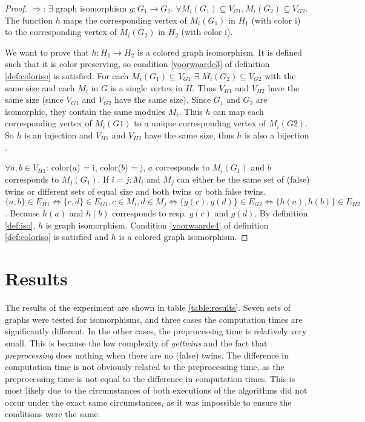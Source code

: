 \documentclass[twoside]{article}
\theoremstyle{definition}
\theoremstyle{plain}
\begin{document}
\begin{multicols}{2}
\begin{proof}
$\Rightarrow$: $\exists$ graph isomorphism $g: G_1 \to G_2$. $\forall M_i (G_1) \subseteq V_{G1}, M_i (G_2) \subseteq V_{G2}$. The function $h$ maps the corresponding vertex of $M_i (G_1)$ in $H_1$ (with color i) to the corresponding vertex of $M_i (G_2)$ in $H_2$ (with color i).

We want to prove that $h: H_1 \to H_2$ is a colored graph isomorphism. It is defined such that it is color preserving, so condition \ref{voorwaarde3} of definition \ref{def:coloriso} is satisfied. For each $M_i (G_1) \subseteq V_{G1}$ $\exists$ $M_i (G_2) \subseteq V_{G2}$ with the same size and each $M_i$ in $G$ is a single vertex in $H$. Thus $V_{H1}$ and $V_{H2}$ have the same size (since $V_{G1}$ and $V_{G2}$ have the same size). Since $G_1$ and $G_2$ are isomorphic, they contain the same modules $M_i$. Thus $h$ can map each corresponding vertex of $M_i (G1)$ to a unique corresponding vertex of $M_i (G2)$. So $h$ is an injection and $V_{H1}$ and $V_{H2}$ have the same size, thus $h$ is also a bijection \cite{website:proofwiki}.

$\forall a, b \in V_{H1}$: color($a$) = i, color($b$) = j, $a$ corresponds to $M_i (G_1)$ and $b$ corresponds to $M_j (G_1)$. If $i=j: M_i$ and $M_j$ can either be the same set of (false) twins or different sets of equal size and both twins or both false twins.  $ \{a, b\} \in E_{H1} \iff \{c,d\} \in E_{G1}, c \in  M_i, d \in  M_j \iff \{g(c),g(d)\} \in E_{G2} \iff \{h(a),h(b)\} \in E_{H2}$. Because $h(a)$ and $h(b)$ corresponds to resp. $g(c)$ and $g(d)$. By definition \ref{def:iso}, $h$ is graph isomorphism. Condition \ref{voorwaarde4} of definition \ref{def:coloriso} is satisfied and $h$ is a colored graph isomorphism.




\end{proof}

\section{Results}

The results of the experiment are shown in table \ref{table:results}. Seven sets of graphs were tested for isomorphisms, and three cases the computation times are significantly different. In the other cases, the preprocessing time is relatively very small. This is because the low complexity of \emph{gettwins} and the fact that \emph{preprocessing} does nothing when there are no (false) twins. The difference in computation time is not obviously related to the preprocessing time, as the preprocessing time is not equal to the difference in computation times. This is most likely due to the circumstances of both executions of the algorithms did not occur under the exact same circumstances, as it was impossible to ensure the conditions were the same.  


\end{multicols}
\end{document}
